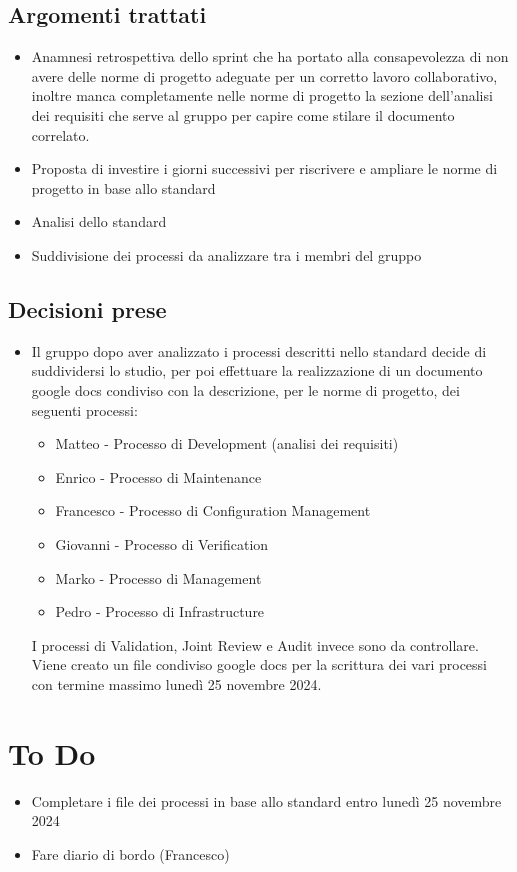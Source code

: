 \documentclass[a4paper, 12pt]{article}
\begin{document}
\subsection{Argomenti trattati}
\begin{itemize}
    \item Anamnesi retrospettiva dello sprint che ha portato alla consapevolezza di non avere delle norme di progetto adeguate per un corretto lavoro collaborativo, inoltre manca completamente nelle norme di progetto la sezione dell'analisi dei requisiti che serve al gruppo per capire come stilare il documento correlato.
    \item Proposta di investire i giorni successivi per riscrivere e ampliare le norme di progetto in base allo standard 
    \item Analisi dello standard 
    \item Suddivisione dei processi da analizzare tra i membri del gruppo
\end{itemize}

\subsection{Decisioni prese}
\begin{itemize}
    \item Il gruppo dopo aver analizzato i processi descritti nello standard  decide di suddividersi lo studio, per poi effettuare la realizzazione di un documento google docs condiviso con la descrizione, per le norme di progetto, dei seguenti processi:
    \begin{itemize}
        \item Matteo - Processo di Development (analisi dei requisiti)
        \item Enrico - Processo di Maintenance
        \item Francesco - Processo di Configuration Management
        \item Giovanni - Processo di Verification
        \item Marko - Processo di Management
        \item Pedro - Processo di Infrastructure
    \end{itemize}
    I processi di Validation, Joint Review e Audit invece sono da controllare.
    Viene creato un file condiviso google docs per la scrittura dei vari processi con termine massimo lunedì 25 novembre 2024.
\end{itemize}

\section{To Do}
    \begin{itemize}
        \item Completare i file dei processi in base allo standard  entro lunedì 25 novembre 2024
        \item Fare diario di bordo (Francesco)
    \end{itemize}
\end{document}
